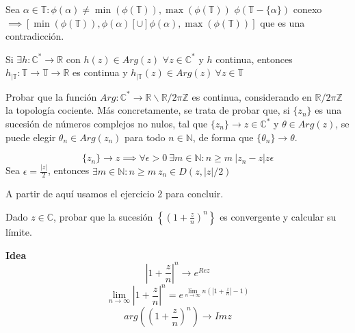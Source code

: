Sea $\alpha\in\mathbb{T} : \phi(\alpha) \not =\min(\phi(\mathbb{T})), \max(\phi(\mathbb{T}))$ 
$\phi ( \mathbb{T}-\{ \alpha \} )$ conexo $\implies [ \min(\phi(\mathbb{T})), \phi(\alpha)[ \cup ]\phi(\alpha), \max( \phi(\mathbb{T}) ) ] $ que es una contradicción.

Si $\exists h:\mathbb{C}^{\ast} \rightarrow \mathbb{R}$ con $h(z)\in Arg(z)$ $\forall z\in\mathbb{C}^{\ast}$ y $h$ continua, entonces
$h_{| \mathbb{T}} : \mathbb{T} \rightarrow \mathbb{T} \rightarrow \mathbb{R}$ es continua y $h_{|\mathbb{T}} (z) \in Arg(z) \ \forall z\in\mathbb{T}$


\begin{ejer}
	Probar que la función $Arg : \mathbb{C}^{\ast} \rightarrow \mathbb{R}\backslash \mathbb{R}/2\pi\mathbb{Z}$ es continua, considerando en $\mathbb{R}/2\pi\mathbb{Z}$ la topología cociente. Más concretamente, se trata de probar que, si $\{z_n\}$ es una sucesión de números complejos no nulos, tal que $\{z_n\} \rightarrow z\in\mathbb{C}^{\ast}$ y $\theta\in Arg(z)$, se puede elegir $\theta_n\in Arg(z_n)$ para todo $n\in\mathbb{N}$, de forma que $\{ \theta_n \} \rightarrow \theta$.
\end{ejer}




\begin{sol}


$$
\{ z_n \} \rightarrow z \implies \forall \epsilon>0\ \exists m\in\mathbb{N} : n\geq m \ |z_n-z|z\epsilon
$$
Sea $\epsilon = \frac{|z|}{2}$, entonces 
$\exists m\in\mathbb{N} :  n\geq m\ z_n\in D(z, |z|/2)$

A partir de aquí usamos el ejercicio $2$ para concluir.
\end{sol}



\begin{ejer}
	Dado $z\in\mathbb{C}$, probar que la sucesión $\left\{ \left( 1+\frac{z}{n} \right)^n \right\}$ es convergente y calcular su límite.
\end{ejer}


\textbf{Idea}
$$
|1+\frac{z}{n}|^n \rightarrow e^{Re z}
$$
$$
\lim_{n\rightarrow\infty} |1+\frac{z}{n}|^n 
= e^{ \lim_{n\rightarrow\infty} n(|1+\frac{z}{n}|-1) }
$$
$$
arg((1+\frac{z}{n})^n) \rightarrow Im z
$$

